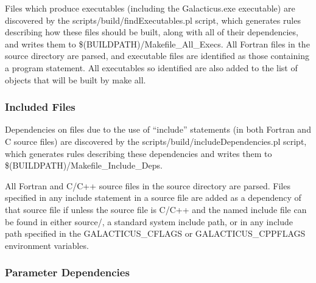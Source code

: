 Files which produce executables (including the {\normalfont \ttfamily Galacticus.exe} executable) are discovered by the {\normalfont \ttfamily scripts/build/findExecutables.pl} script, which generates rules describing how these files should be built, along with all of their dependencies, and writes them to {\normalfont \ttfamily \$(BUILDPATH)/Makefile\_All\_Execs}. All Fortran files in the {\normalfont \ttfamily source} directory are parsed, and executable files are identified as those containing a {\normalfont \ttfamily program} statement. All executables so identified are also added to the list of objects that will be built by {\normalfont \ttfamily make all}.

\subsubsection{Included Files}\label{sec:buildIncludeDeps}

Dependencies on files due to the use of ``{\normalfont \ttfamily include}'' statements (in both Fortran and C source files) are discovered by the {\normalfont \ttfamily scripts/build/includeDependencies.pl} script, which generates rules describing these dependencies and writes them to {\normalfont \ttfamily \$(BUILDPATH)/Makefile\_Include\_Deps}.

All Fortran and C/C++ source files in the {\normalfont \ttfamily source} directory are parsed. Files specified in any include statement in a source file are added as a dependency of that source file if unless the source file is C/C++ and the named include file can be found in either {\normalfont \ttfamily source/}, a standard system include path, or in any include path specified in the {\normalfont \ttfamily GALACTICUS\_CFLAGS} or {\normalfont \ttfamily GALACTICUS\_CPPFLAGS} environment variables.

\subsubsection{Parameter Dependencies}\label{sec:parameterDependencies}

